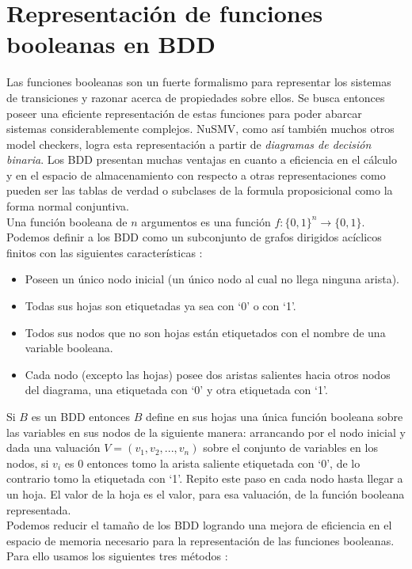 \documentclass[titlepage, 12pt]{book}
\begin{document}
\section{Representaci\'on de funciones booleanas en BDD}
\label{boolBDD}

Las funciones booleanas son un fuerte formalismo para representar los sistemas de transiciones y razonar acerca de propiedades sobre ellos. Se busca entonces poseer una eficiente representaci\'on de estas funciones para poder abarcar sistemas considerablemente complejos. NuSMV, como as\'i tambi\'en muchos otros model checkers, logra esta representaci\'on a partir de \textit{diagramas de decisi\'on binaria}. Los BDD presentan muchas ventajas en cuanto a eficiencia en el c\'alculo y en el espacio de almacenamiento con respecto a otras representaciones como pueden ser las tablas de verdad o subclases de la formula proposicional como la forma normal conjuntiva.\\

Una funci\'on booleana de $n$ argumentos es una funci\'on $f : \{0,1\}^n \to \{0,1\}$. Podemos definir a los BDD como un subconjunto de grafos dirigidos ac\'iclicos finitos con las siguientes caracter\'isticas \cite{Huth}:

\begin{itemize}
\item Poseen un \'unico nodo inicial (un \'unico nodo al cual no llega ninguna arista).
\item Todas sus hojas son etiquetadas ya sea con `0' o con `1'.
\item Todos sus nodos que no son hojas est\'an etiquetados con el nombre de una variable booleana.
\item Cada nodo (excepto las hojas) posee dos aristas salientes hacia otros nodos del diagrama, una etiquetada con `0' y otra etiquetada con `1'.
\end{itemize}

Si $B$ es un BDD entonces $B$ define en sus hojas una \'unica funci\'on booleana sobre las variables en sus nodos de la siguiente manera: arrancando por el nodo inicial y dada una valuaci\'on $V=(v_1,v_2,...,v_n)$ sobre el conjunto de variables en los nodos, si $v_i$ es $0$ entonces tomo la arista saliente etiquetada con `0', de lo contrario tomo la etiquetada con `1'. Repito este paso en cada nodo hasta llegar a un hoja. El valor de la hoja es el valor, para esa valuaci\'on, de la funci\'on booleana representada.\\

Podemos reducir el tama\~no de los BDD logrando una mejora de eficiencia en el espacio de memoria necesario para la representaci\'on de las funciones booleanas. Para ello usamos los siguientes tres m\'etodos \cite{Huth}:
\end{document}
